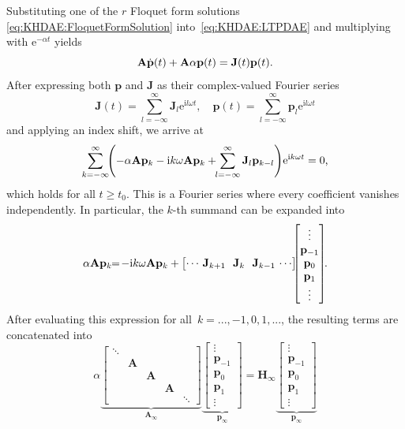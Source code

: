 \documentclass[a4paper, nonatbib, 3p, twocolumn]{elsarticle}
\theoremstyle{plain}
\theoremstyle{definition}
\theoremstyle{remark}
\newcommand{\ic}{\ri} %
\newcommand{\ex}{\re} %
\newcommand{\re}{\mathrm e}
\newcommand{\ri}{\mathrm i}
\newcommand{\vp}{\mathbf p}
\newcommand{\vA}{\mathbf A}
\newcommand{\vH}{\mathbf H}
\newcommand{\vJ}{\mathbf J}
\begin{document}
Substituting one of the $r$ Floquet form solutions \eqref{eq:KHDAE:FloquetFormSolution} into~\eqref{eq:KHDAE:LTPDAE} and multiplying with $\ex^{-\alpha t}$ yields
\begin{equation}
    \vA\dot{\vp}(t) + \vA\alpha\vp(t) = \vJ(t)\vp(t)\textnormal{.}
\end{equation}
After expressing both $\vp$ and $\vJ$ as their complex-valued Fourier series 
\begin{equation}\label{eq:KHDAE:Fourier}
    \vJ(t) = \sum_{l=-\infty}^{\infty} \vJ_l\ex^{\ic l\omega t}, \quad \vp(t) = \sum_{l=-\infty}^{\infty} \vp_l\ex^{\ic l\omega t}
\end{equation}
and applying an index shift, we arrive at
\begin{equation}
	\sum_{k=-\infty}^{\infty}\!\!\left( -\alpha\vA\vp_k-\ic k\omega\vA\vp_k   + \!\!\sum_{l=-\infty}^{\infty} \vJ_l\vp_{k-l}\right)\!\ex^{\ic k\omega t}= 0\textnormal{,}
\end{equation}
which holds for all $t\geq t_0$.
This is a Fourier series where every coefficient vanishes independently.
In particular, the $k$-th summand can be expanded into
\begin{equation}\label{eq:KHDAE:deriveHEP}
	\alpha\vA\vp_k \!\!=\! -\ic k\omega\vA\vp_k + 
	\begin{bmatrix}
		\cdots \!\!\!\!& \vJ_{k+1}\!\! & \vJ_{k}\!\! & \vJ_{k-1} \!\!\!\!&\cdots
	\end{bmatrix}\!\!\!
	\begin{bmatrix}
		\vdots \\ \vp_{-1} \\ \vp_{0} \\ \vp_{1} \\ \vdots
	\end{bmatrix}\!\!\textnormal{.}
\end{equation}
After evaluating this expression for all~$k=..., -1, 0, 1, ...$, the resulting terms are concatenated into
\begin{equation}\label{eq:KHDAE:generalizedHill}
	\alpha \!
	\underbrace{\begin{bmatrix}
			\ddots\!\!&&&&\\
			&\!\!\vA\!\!&&&\\
			&&\!\!\vA\!\!&&\\
			&&&\!\!\vA\!\!&\\
			&&&&\!\!\ddots
	\end{bmatrix}\!}_{\vA_\infty}
	\underbrace{\!\begin{bmatrix}
			\vdots \\ \vp_{-1} \\ \vp_{0} \\ \vp_{1}\\ \vdots
	\end{bmatrix}\!}_{\vp_\infty} \!
	= \vH_\infty
	\underbrace{\!\begin{bmatrix}
			\vdots \\ \vp_{-1} \\ \vp_{0} \\ \vp_{1}\\ \vdots
	\end{bmatrix}\!}_{\vp_\infty}
\end{equation}
\end{document}
